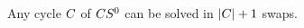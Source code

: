 \documentclass[msc]{ppgccufmg}    %
\begin{document}


\begin{lemma}
\label{lem:s_zerocycle}
Any cycle $C$ of $CS^{0}$ can be solved in $|C| + 1$ swaps.
\end{lemma}
\end{document}
